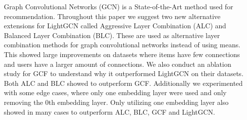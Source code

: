 Graph Convolutional Networks (GCN) is a State-of-the-Art method used for recommendation.
Throughout this paper we suggest two new alternative extensions for LightGCN called Aggressive Layer Combination (ALC) and Balanced Layer Combination (BLC).
These are used as alternative layer combination methods for graph convolutional networks instead of using means.
This showed large improvements on datasets where items have few connections and users have a larger amount of connections.
We also conduct an ablation study for GCF to understand why it outperformed LightGCN on their datasets.
Both ALC and BLC showed to outperform GCF.
Additionally we experimented with some edge cases, where only one embedding layer were used and only removing the 0th embedding layer.
Only utilizing one embedding layer also showed in many cases to outperform ALC, BLC, GCF and LightGCN.